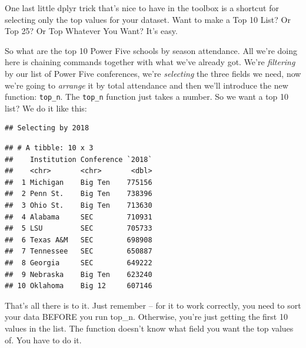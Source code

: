 \documentclass[]{book}
\newenvironment{Shaded}{\begin{snugshade}}{\end{snugshade}}
\newcommand{\DataTypeTok}[1]{\textcolor[rgb]{0.13,0.29,0.53}{#1}}
\newcommand{\DecValTok}[1]{\textcolor[rgb]{0.00,0.00,0.81}{#1}}
\newcommand{\KeywordTok}[1]{\textcolor[rgb]{0.13,0.29,0.53}{\textbf{#1}}}
\newcommand{\NormalTok}[1]{#1}
\newcommand{\OperatorTok}[1]{\textcolor[rgb]{0.81,0.36,0.00}{\textbf{#1}}}
\newcommand{\StringTok}[1]{\textcolor[rgb]{0.31,0.60,0.02}{#1}}
\begin{document}
One last little dplyr trick that's nice to have in the toolbox is a shortcut for selecting only the top values for your dataset. Want to make a Top 10 List? Or Top 25? Or Top Whatever You Want? It's easy.

So what are the top 10 Power Five schools by season attendance. All we're doing here is chaining commands together with what we've already got. We're \emph{filtering} by our list of Power Five conferences, we're \emph{selecting} the three fields we need, now we're going to \emph{arrange} it by total attendance and then we'll introduce the new function: \texttt{top\_n}. The \texttt{top\_n} function just takes a number. So we want a top 10 list? We do it like this:

\begin{Shaded}
\end{Shaded}

\begin{verbatim}
## Selecting by 2018
\end{verbatim}

\begin{verbatim}
## # A tibble: 10 x 3
##    Institution Conference `2018`
##    <chr>       <chr>       <dbl>
##  1 Michigan    Big Ten    775156
##  2 Penn St.    Big Ten    738396
##  3 Ohio St.    Big Ten    713630
##  4 Alabama     SEC        710931
##  5 LSU         SEC        705733
##  6 Texas A&M   SEC        698908
##  7 Tennessee   SEC        650887
##  8 Georgia     SEC        649222
##  9 Nebraska    Big Ten    623240
## 10 Oklahoma    Big 12     607146
\end{verbatim}

That's all there is to it. Just remember -- for it to work correctly, you need to sort your data BEFORE you run top\_n. Otherwise, you're just getting the first 10 values in the list. The function doesn't know what field you want the top values of. You have to do it.
\end{document}
